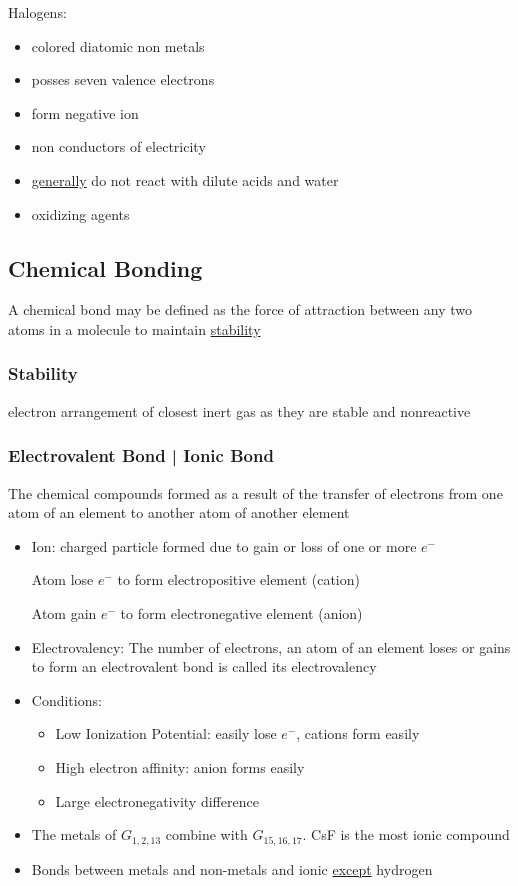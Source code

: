 \documentclass[a4paper]{article}
\begin{document}
	Halogens:
	\begin{itemize}
		\item colored diatomic non metals
		\item posses seven valence electrons
		\item form negative ion
		\item non conductors of electricity
		\item \underline{generally} do not react with dilute acids and water
		\item oxidizing agents
	\end{itemize}

	\subsection{Chemical Bonding}
	A chemical bond may be defined as the force of attraction between any two atoms in a molecule to maintain \underline{stability}

	\subsubsection{Stability}
	electron arrangement of closest inert gas as they are stable and nonreactive

	\subsubsection{Electrovalent Bond | Ionic Bond}
	The chemical compounds formed as a result of the transfer of electrons from one atom of an element to another atom of another element

	\begin{itemize}
		\item Ion: charged particle formed due to gain or loss of one or more $e^-$

	Atom lose $e^-$ to form electropositive element (cation)

	Atom gain $e^-$ to form electronegative element (anion)

		\item Electrovalency: The number of electrons, an atom of an element loses or gains to form an electrovalent bond is called its electrovalency

		\item Conditions:
			\begin{itemize}
				\item Low Ionization Potential: easily lose $e^-$, cations form easily
				\item High electron affinity: anion forms easily
				\item Large electronegativity difference
			\end{itemize}

		\item The metals of $G_{1,2,13}$ combine with $G_{15,16,17}$. CsF is the most ionic compound

		\item Bonds between metals and non-metals and ionic \underline{except} hydrogen
	\end{itemize}
\end{document}
